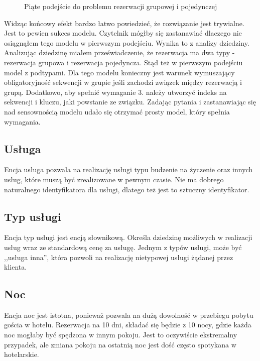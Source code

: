 \documentclass[a4paper,onecolumn,oneside,11pt,wide,floatssmall]{mwrep}
\theoremstyle{definition}
\theoremstyle{plain}%
\theoremstyle{remark}
\begin{document}
\begin{figure}[H]
  \begin{center}
  \end{center}
  \caption{Piąte podejście do problemu rezerwacji grupowej i pojedynczej}
  \label{fig:db-logical-model-group-reservation-fifth-try}
\end{figure}

Widząc końcowy efekt bardzo łatwo powiedzieć, że rozwiązanie jest trywialne. Jest to pewien sukces modelu. Czytelnik mógłby się zastanawiać dlaczego nie osiągnąłem tego modelu w pierwszym podejściu. Wynika to z analizy dziedziny. Analizując dziedzinę miałem przeświadczenie, że rezerwacja ma dwa typy - rezerwacja grupowa i rezerwacja pojedyncza. Stąd też w pierwszym podejściu model z podtypami. Dla tego modelu konieczny jest warunek wymuszający obligatoryjność sekwencji w grupie jeśli zachodzi związek między rezerwacją i grupą. Dodatkowo, aby spełnić wymaganie 3. należy utworzyć indeks na sekwencji i kluczu, jaki powstanie ze związku. Zadając pytania i zastanawiając się nad sensownością modelu udało się otrzymać prosty model, który spełnia wymagania.

\subsection{Usługa}
Encja usługa pozwala na realizację usługi typu budzenie na życzenie oraz innych usług, które muszą być zrealizowane w pewnym czasie. Nie ma dobrego naturalnego identyfikatora dla usługi, dlatego też jest to sztuczny identyfikator.

\subsection{Typ usługi}
Encja typ usługi jest encją słownikową. Określa dziedzinę możliwych w realizacji usług wraz ze standardową cenę za usługę. Jednym z typów usługi, może być ,,usługa inna'', która pozwoli na realizację nietypowej usługi żądanej przez klienta.

\subsection{Noc}
Encja noc jest istotna, ponieważ pozwala na dużą dowolność w przebiegu pobytu gościa w hotelu. Rezerwacja na 10 dni, składać się będzie z 10 nocy, gdzie każda noc mogłaby być spędzona w innym pokoju. Jest to oczywiście ekstremalny przypadek, ale zmiana pokoju na ostatnią noc jest dość często spotykana w hotelarskie.
\end{document}
